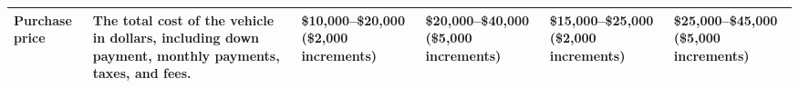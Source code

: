\begin{table}[pos=H]
\begin{adjustbox}{width=\textwidth, center}
{\begin{tabular}{p{3.2cm} p{4.8cm} p{3cm} p{3cm} p{3cm} p{3cm}}
\addlinespace[4pt]
Purchase price & The total cost of the vehicle in dollars, including down payment, monthly payments, taxes, and fees. & \$10,000--\$20,000 \newline (\$2,000 increments) & \$20,000--\$40,000 \newline (\$5,000 increments) & \$15,000--\$25,000 \newline (\$2,000 increments) & \$25,000--\$45,000 \newline (\$5,000 increments) \\
\bottomrule
\end{tabular}}
\end{adjustbox}
\end{table}
